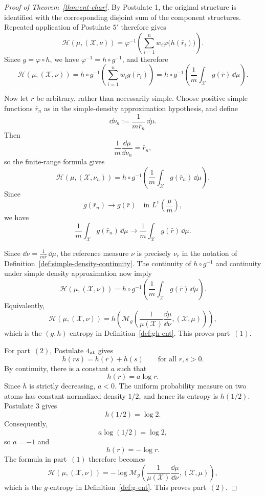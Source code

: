\documentclass[reqno]{amsart}
\begin{document}
\begin{proof}[Proof of Theorem~\ref{thm:ent-char}]
By Postulate 1, the original structure is identified with the corresponding
disjoint sum of the component structures. Repeated application of
Postulate $5'$ therefore gives
$$
\mathcal H(\mu,(\mathcal X,\nu))
=
\varphi^{-1}
\left(
\sum_{i=1}^n
w_i\varphi\bigl(h(\bar r_i)\bigr)
\right).
$$
Since $g=\varphi\circ h$, we have
$\varphi^{-1}=h\circ g^{-1}$,
and therefore
$$
\mathcal H(\mu,(\mathcal X,\nu))
=
h\circ g^{-1}
\left(
\sum_{i=1}^n w_i g(\bar r_i)
\right)
=
h\circ g^{-1}
\left(
\frac{1}{m}
\int_{\mathcal X}g(\bar r)\,\dd\mu
\right).
$$


Now let $\bar{r}$ be arbitrary, rather than necessarily simple.
Choose positive simple functions $\bar r_n$ as in the simple-density
approximation hypothesis, and define
$$
\dd\nu_n:=\frac{1}{m\bar r_n}\,\dd\mu.
$$
Then
$$
\frac{1}{m}\frac{\dd\mu}{\dd\nu_n}=\bar r_n,
$$
so the finite-range formula gives
$$
\mathcal H(\mu,(\mathcal X,\nu_n))
=
h\circ g^{-1}
\left(
\frac{1}{m}
\int_{\mathcal X}g(\bar r_n)\,\dd\mu
\right).
$$
Since
$$
g(\bar r_n)\longrightarrow g(\bar r)
\quad\text{in }L^1\left(\frac{\mu}{m}\right),
$$
we have
$$
\frac{1}{m}
\int_{\mathcal X}g(\bar r_n)\,\dd\mu
\longrightarrow
\frac{1}{m}
\int_{\mathcal X}g(\bar r)\,\dd\mu.
$$


Since $\dd\nu=\frac{1}{m\bar r}\,\dd\mu$, the reference measure $\nu$ is precisely $\nu_{\bar r}$ in the
notation of Definition~\ref{def:simple-density-continuity}.
The continuity of $h\circ g^{-1}$ and continuity under simple density
approximation now imply
$$
\mathcal H(\mu,(\mathcal X,\nu))
=
h\circ g^{-1}
\left(
\frac{1}{m}
\int_{\mathcal X}g(\bar r)\,\dd\mu
\right).
$$
Equivalently,
$$
\mathcal H(\mu,(\mathcal X,\nu))
=
h\left(
\mathcal M_g
\left(
\frac{1}{\mu(\mathcal X)}
\frac{\dd\mu}{\dd\nu},
(\mathcal X,\mu)
\right)
\right),
$$
which is the $(g,h)$-entropy in Definition~\ref{def:gh-ent}. This proves
part~$(1)$.

For part~$(2)$, Postulate $4_{\rm at}$ gives
$$
h(rs)=h(r)+h(s)
\qquad
\text{for all }r,s>0.
$$
By continuity, there is a constant $a$ such that
$$
h(r)=a\log r.
$$
Since $h$ is strictly decreasing, $a<0$. The uniform probability measure
on two atoms has constant normalized density $1/2$, and hence its entropy
is $h(1/2)$. Postulate 3 gives
$$
h(1/2)=\log 2.
$$
Consequently,
$$
a\log(1/2)=\log 2,
$$
so $a=-1$ and
$$
h(r)=-\log r.
$$
The formula in part~$(1)$ therefore becomes
$$
\mathcal H(\mu,(\mathcal X,\nu))
=
-\log
\mathcal M_g
\left(
\frac{1}{\mu(\mathcal X)}
\frac{\dd\mu}{\dd\nu},
(\mathcal X,\mu)
\right),
$$
which is the $g$-entropy in Definition~\ref{def:g-ent}. This proves
part~$(2)$.


\end{proof}
\end{document}
